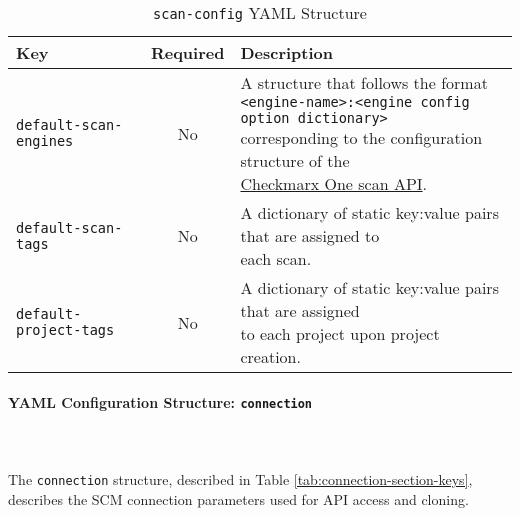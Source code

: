\begin{table}[h]
    \caption{\texttt{scan-config} YAML Structure}  
    \label{tab:scan-config-section-keys}      
    \begin{tabularx}{\textwidth}{lcl}
        \toprule
        \textbf{Key} & \textbf{Required} & \textbf{Description}\\
        \midrule
        \texttt{default-scan-engines} & No & \makecell[l]{A structure that follows the format\\\texttt{<engine-name>:<engine config option dictionary>}\\corresponding to the configuration structure of the\\\href{https://checkmarx.stoplight.io/docs/checkmarx-one-api-reference-guide/branches/main/f601dd9456e80-run-a-scan}{Checkmarx One scan API}.}\\
        \midrule
        \texttt{default-scan-tags} & No &  \makecell[l]{A dictionary of static key:value pairs that are assigned to\\each scan.}\\
        \midrule
        \texttt{default-project-tags} & No & \makecell[l]{A dictionary of static key:value pairs that are assigned\\to each project upon project creation.}\\
        \bottomrule
    \end{tabularx}
\end{table}


\paragraph{YAML Configuration Structure: \texttt{connection} }\label{sec:connection-structure}

\noindent\\\\The \texttt{connection} structure, described in Table \ref{tab:connection-section-keys}, 
describes the SCM connection parameters used for API access and cloning.


